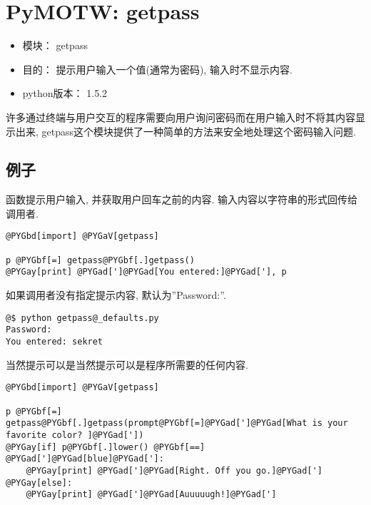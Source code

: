 \documentclass[a4paper,10pt,english]{manual}
\begin{document}
\resetcurrentobjects


\chapter{PyMOTW: getpass}
\begin{itemize}
\item {} 
模块： getpass

\item {} 
目的： 提示用户输入一个值(通常为密码), 输入时不显示内容.

\item {} 
python版本： 1.5.2

\end{itemize}

许多通过终端与用户交互的程序需要向用户询问密码而在用户输入时不将其内容显示出来, getpass这个模块提供了一种简单的方法来安全地处理这个密码输入问题.


\section{例子}

 函数提示用户输入, 并获取用户回车之前的内容. 输入内容以字符串的形式回传给调用者.

\begin{Verbatim}[commandchars=@\[\]]
@PYGbd[import] @PYGaV[getpass]

p @PYGbf[=] getpass@PYGbf[.]getpass()
@PYGay[print] @PYGad[']@PYGad[You entered:]@PYGad['], p
\end{Verbatim}

如果调用者没有指定提示内容, 默认为''Password:''.

\begin{Verbatim}[commandchars=@\[\]]
@$ python getpass@_defaults.py
Password:
You entered: sekret
\end{Verbatim}

当然提示可以是当然提示可以是程序所需要的任何内容.

\begin{Verbatim}[commandchars=@\[\]]
@PYGbd[import] @PYGaV[getpass]

p @PYGbf[=] getpass@PYGbf[.]getpass(prompt@PYGbf[=]@PYGad[']@PYGad[What is your favorite color? ]@PYGad['])
@PYGay[if] p@PYGbf[.]lower() @PYGbf[==] @PYGad[']@PYGad[blue]@PYGad[']:
    @PYGay[print] @PYGad[']@PYGad[Right. Off you go.]@PYGad[']
@PYGay[else]:
    @PYGay[print] @PYGad[']@PYGad[Auuuuugh!]@PYGad[']
\end{Verbatim}
\end{document}
